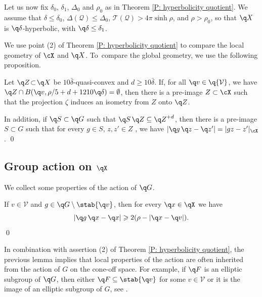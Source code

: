 Let us now fix $\delta_0$, $\delta_1$, $\Delta_0$ and $\rho_0$ as in Theorem \ref{P: hyperbolicity quotient}. We assume that $\delta \leq \delta_0$, $\Delta(\mathcal Q) \leq \Delta_0$, $\mathcal T(\mathcal Q) > 4\pi \sinh\rho$, and $\rho > \rho_0$, so that $\q X$ is $\q \delta$-hyperbolic, with $\q \delta \leq \delta_1$.

We use point (2) of Theorem \ref{P: hyperbolicity quotient} to compare the local geometry of $\cX $ and $\q X$. To~compare the global geometry, we use the following proposition.

\begin{prop}\label{L: lifts of quasi-convex} Let $\q Z\!\subset\!\q X$ be $10 \bar\delta$-quasi-convex and \hbox{$d\!\geqslant\!10 \bar\delta$}.
If, for all $\q v \in \q {\mathcal V}$, we have $\q Z \cap B(\q v, \rho/5 +d+ 1210 \q \delta) =\emptyset$, then there is a pre-image $Z \subset \cX$ such that the projection $\zeta$ induces an isometry from $Z$ onto $\q Z$.

In addition, if $\q S\subset \q G$ such that $\q S \, \q Z \subseteq {\q Z}^{+d}$, then there is a pre-image $S\subset G$ such that for every $g \in S$, $z,z' \in Z$
, we have $|\q g\, \q z -\q z '| =|g z-z'|_{\cX}$.
\qed
\end{prop}

\subsection{Group action on \texorpdfstring{$\qX$}{X}}

We collect some properties of the action of $\q G$.

\begin{lem}\label{L: rotation quotient space} If $v\in \mathcal V$ and $g\in \q G \setminus \stab{\q v}$, then for every $\q x\in \qX$ we have
\begin{equation*}
|\q g \,\q x -\q x|\geqslant 2(\rho - |\q x -\q v|).
\end{equation*} \qed
\end{lem}

In combination with assertion (2) of Theorem \ref{P: hyperbolicity quotient}, the previous lemma implies that local properties of the action are often inherited from the action of $G$ on the cone-off space. For example, if $\q F$ is an elliptic subgroup of $\q G$, then either $\q F \subseteq \stab{\q v}$ for some $v\in \mathcal V$ or it is the image of an elliptic subgroup of $G$, see \cite[Prop.\,6.12]{coulon_geometry_2014}.

